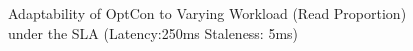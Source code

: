 \documentclass[conference]{IEEEtran}
\begin{document}
\begin{figure}[!ht]
\hfill
\caption{Adaptability of OptCon to Varying Workload (Read Proportion) under the SLA (Latency:250ms Staleness: 5ms)}
\end{figure}
\end{document}
